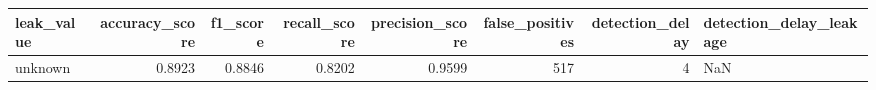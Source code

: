 \begin{tabular}{lrrrrrrl}
\toprule
leak\_value & accuracy\_score & f1\_score & recall\_score & precision\_score & false\_positives & detection\_delay & detection\_delay\_leakage \\
\midrule
unknown & 0.8923 & 0.8846 & 0.8202 & 0.9599 & 517 & 4 & NaN \\
\bottomrule
\end{tabular}

